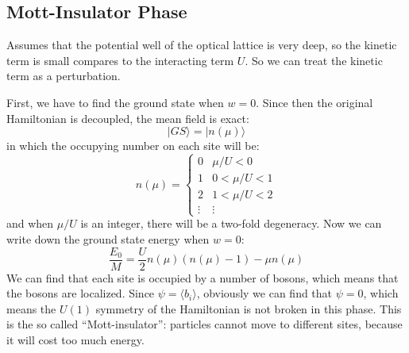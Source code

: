 \documentclass{article}
\begin{document}
\subsection{Mott-Insulator Phase}
Assumes that the potential well of the optical lattice is very deep, so the kinetic term is small compares to the interacting term $U$. So we can treat the kinetic term as a perturbation. 

First, we have to find the ground state when $w=0$. Since then the original Hamiltonian is decoupled, the mean field is exact:
\begin{equation}
|GS\rangle = | n(\mu)\rangle
\end{equation}
in which the occupying number on each site will be:
$$
n(\mu) = \left\{ \begin{array}{ll}
0 & \mu/U<0 \\
1 & 0<\mu/U<1\\
2 & 1<\mu/U<2\\
\vdots &\vdots
\end{array}\right.
$$
and when $\mu/U$ is an integer, there will be a two-fold degeneracy. Now we can write down the ground state energy when $w= 0$:
\begin{equation}
\frac{E_0}{M} = \frac{U}{2}n(\mu)(n(\mu)-1)-\mu n(\mu)
\end{equation}
We can find that each site is occupied by a number of bosons, which means that the bosons are localized. Since $\psi = \langle b_i \rangle$, obviously we can find that $\psi = 0$, which means the $U(1)$ symmetry of the Hamiltonian is not broken in this phase. This is the so called ``Mott-insulator'': particles cannot move to different sites, because it will cost too much energy.
\end{document}
